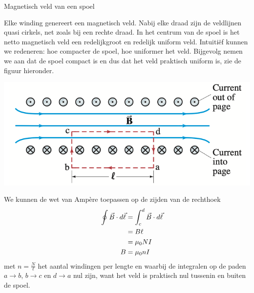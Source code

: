 \begin{app}{Magnetisch veld van een spoel}


    \noindent Elke winding genereert een magnetisch veld. Nabij elke draad zijn de veldlijnen quasi cirkels, net zoals bij een rechte draad. 
    In het centrum van de spoel is het netto magnetisch veld een redelijkgroot en redelijk uniform veld. Intuitiëf kunnen we redeneren: hoe compacter de spoel, hoe uniformer het veld. 
    Bijgevolg nemen we aan dat de spoel compact is en dus dat het veld praktisch uniform is, zie de figuur hieronder.

    \begin{center}
        \hspace*{1cm}\includegraphics[scale = 0.3]{Images/Magnetisme/SpoelMagnetischVeld}
    \end{center}

    \noindent We kunnen de wet van Ampère toepassen op de zijden van de rechthoek
    \begin{align*}
        \hspace{0.55cm}
        \oint \Vec{B} \cdot d\Vec{\ell} 
                                        &= \int_{c}^{d} \Vec{B} \cdot d\Vec{\ell}  \\
                                        &= B\ell \\
                                        &=  \mu_{0}NI \\ 
                                      B &=  \mu_{0}nI                          
    \end{align*}
    met $n= \tfrac{N}{\ell}$ het aantal windingen per lengte en waarbij de integralen op de paden $a \to b$, $b \to c$ en $d \to a$ nul zijn, want het veld is praktisch nul tussenin en buiten de spoel. 
    

\end{app}
